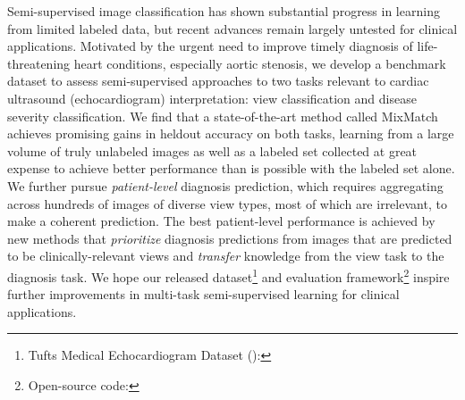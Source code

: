 Semi-supervised image classification has shown substantial progress in learning from limited labeled data, but recent advances remain largely untested for clinical applications.
Motivated by the urgent need to improve timely diagnosis of life-threatening heart conditions, especially aortic stenosis,
we develop a benchmark dataset to assess semi-supervised approaches to two tasks relevant to cardiac ultrasound (echocardiogram) interpretation: view classification and disease severity classification.
We find that a state-of-the-art method called MixMatch achieves promising gains in heldout accuracy on both tasks, learning from a large volume of truly unlabeled images as well as a labeled set collected at great expense to achieve better performance than is possible with the labeled set alone.
We further pursue \emph{patient-level} diagnosis prediction, which requires aggregating across hundreds of images of diverse view types, most of which are irrelevant, to make a coherent prediction.
The best patient-level performance is achieved by new methods that \emph{prioritize} diagnosis predictions from images that are predicted to be clinically-relevant views and \emph{transfer} knowledge from the view task to the diagnosis task.
We hope our released dataset\footnote{Tufts Medical Echocardiogram Dataset (\datasetName): \datasetURL} and evaluation framework\footnote{Open-source code: \codeURL} inspire further improvements in multi-task semi-supervised learning for clinical applications.
